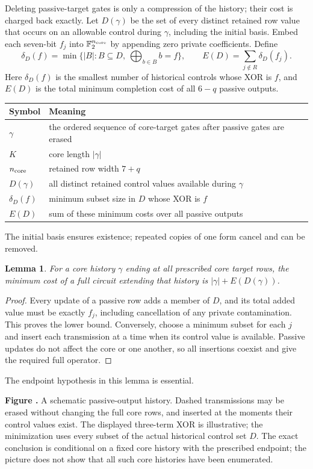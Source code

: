 \documentclass[11pt]{article}
\newtheorem{lemma}[theorem]{Lemma}
\newcommand{\F}{\mathbb F_2}
\newcommand{\prooffigure}[3]{%
  \begin{center}
  \begin{minipage}{.98\linewidth}
  \centering
  \resizebox{\linewidth}{!}{}\par
  \refstepcounter{figure}\label{#2}%
  \small\textbf{Figure \thefigure.} #3
  \end{minipage}
  \end{center}}
\begin{document}
Deleting passive-target gates is only a compression of the history; their
cost is charged back exactly. Let $D(\gamma)$ be the set of every distinct
retained row value that occurs on an allowable control during $\gamma$,
including the initial basis. Embed each seven-bit $f_j$ into
$\F^{n_{\rm core}}$ by appending zero private coefficients. Define
\[
\delta_D(f)=\min\{|B|:B\subseteq D,\ \bigoplus_{b\in B}b=f\},
\qquad E(D)=\sum_{j\notin R}\delta_D(f_j).
\]
Here $\delta_D(f)$ is the smallest number of historical controls whose XOR
is $f$, and $E(D)$ is the total minimum completion cost of all $6-q$ passive
outputs.
\begin{center}\begin{tabular}{lp{.70\linewidth}}\toprule
Symbol&Meaning\\\midrule
$\gamma$&the ordered sequence of core-target gates after passive gates are erased\\
$K$&core length $|\gamma|$\\
$n_{\rm core}$&retained row width $7+q$\\
$D(\gamma)$&all distinct retained control values available during $\gamma$\\
$\delta_D(f)$&minimum subset size in $D$ whose XOR is $f$\\
$E(D)$&sum of these minimum costs over all passive outputs\\\bottomrule
\end{tabular}\end{center}
The initial basis ensures existence; repeated copies of one form cancel
and can be removed.
\begin{lemma}\label{lem:passive}
For a core history $\gamma$ ending at all prescribed core target rows,
the minimum cost of a full circuit extending that history is
$|\gamma|+E(D(\gamma))$.
\end{lemma}
\begin{proof}
Every update of a passive row adds a member of $D$, and its total added
value must be exactly $f_j$, including cancellation of any private
contamination. This proves the lower bound. Conversely, choose a minimum
subset for each $j$ and insert each transmission at a time when its
control value is available. Passive updates do not affect the core or
one another, so all insertions coexist and give the required full operator.
\end{proof}
The endpoint hypothesis in this lemma is essential.
\prooffigure{passive_elimination}{fig:passive}{A schematic passive-output
history. Dashed transmissions may be erased without changing the full core
rows, and inserted at the moments their control values exist. The displayed
three-term XOR is illustrative; the minimization uses every subset of the
actual historical control set $D$. The exact conclusion is conditional on a
fixed core history with the prescribed endpoint; the picture does not show
that all such core histories have been enumerated.}
\end{document}
